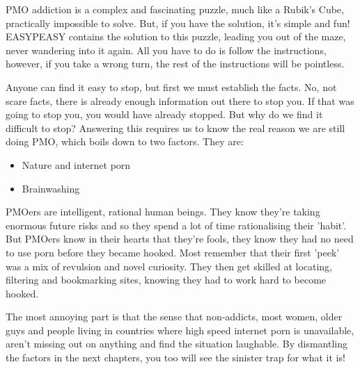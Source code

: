 \documentclass[easypeasy.tex]{subfiles}
\begin{document}
PMO addiction is a complex and fascinating puzzle, much like a Rubik's Cube, practically impossible to solve. But, if you have the solution, it's simple and fun! EASYPEASY contains the solution to this puzzle, leading you out of the maze, never wandering into it again. All you have to do is follow the instructions, however, if you take a wrong turn, the rest of the instructions will be pointless.

Anyone can find it easy to stop, but first we must establish the facts. No, not scare facts, there is already enough information out there to stop you. If that was going to stop you, you would have already stopped. But why do we find it difficult to stop? Answering this requires us to know the real reason we are still doing PMO, which boils down to two factors. They are:
\begin{itemize}
  \item Nature and internet porn\\
  \item Brainwashing
\end{itemize}

PMOers are intelligent, rational human beings. They know they're taking enormous future risks and so they spend a lot of time rationalising their 'habit'. But PMOers know in their hearts that they're fools, they know they had no need to use porn before they became hooked. Most remember that their first 'peek' was a mix of revulsion and novel curiosity. They then get skilled at locating, filtering and bookmarking sites, knowing they had to work hard to become hooked.

The most annoying part is that the sense that non-addicts, most women, older guys and people living in countries where high speed internet porn is unavailable, aren't missing out on anything and find the situation laughable. By dismantling the factors in the next chapters, you too will see the sinister trap for what it is!
\end{document}
